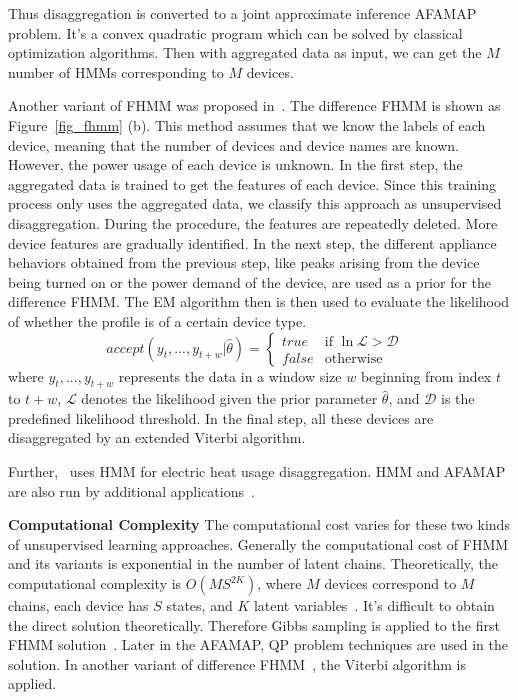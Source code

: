 Thus disaggregation is converted to a joint approximate inference AFAMAP problem.  
It's a convex quadratic program which can be solved by classical optimization algorithms.
Then with aggregated data as input, we can get the $M$ number of HMMs corresponding to $M$ devices. 

Another variant of FHMM was proposed in~\cite{parson2012nonintrusive}. 
The difference FHMM is shown as Figure~\ref{fig_fhmm} (b). 
This method assumes that we know the labels of each device, meaning that the number of devices and device names are known. 
However, the power usage of each device is unknown. 
In the first step, the aggregated data is 
trained to get the features of each device. 
Since this training process only uses the aggregated data, we classify this approach as unsupervised disaggregation. 
During the procedure, 
the features are repeatedly deleted. 
More device features are gradually identified. 
In the next step, the different appliance behaviors obtained from the previous step, like peaks arising from the device being turned on or the power demand of the device, 
are used as a prior for the difference FHMM. The EM algorithm then is then used to evaluate the likelihood of whether the profile is of a certain device type.
\begin{displaymath}
accept(y_{t},...,y_{t+w}|\hat{\theta})= \left \{ \begin{array} {ll}
true & \textrm{if $\ln\mathcal{L} > \mathcal{D}$ } \\
false & \textrm{otherwise} \end{array} \right.
\end{displaymath}
where $y_t,...,y_{t+w}$ represents the data in a window size $w$
beginning from index $t$ to $t+w$, $\mathcal{L}$ denotes the
likelihood given the prior parameter $\hat{\theta}$,
and $\mathcal{D}$ is the predefined likelihood threshold.
In the final step, all these devices are disaggregated by an extended Viterbi algorithm. 

Further,~\cite{huang2013designing} uses HMM for electric heat usage disaggregation. %
HMM and AFAMAP are also run by additional applications~\cite{lukaszewski2013methods}. 

\textbf{Computational Complexity}
The computational cost varies for these two kinds of unsupervised learning 
approaches.
Generally the computational cost of FHMM and its variants is exponential in 
the number of latent chains.  
Theoretically, the computational complexity is 
$O(MS^{2K})$, where $M$ devices correspond to $M$ chains, 
each device has $S$ states, and $K$ latent variables~\cite{bishop2006pattern}. 
It's difficult to obtain the direct solution theoretically. 
Therefore Gibbs sampling is applied to the first 
FHMM solution~\cite{kim2011unsupervised}. 
Later in the AFAMAP, QP problem techniques are used in the solution.
In another variant of difference FHMM~\cite{parson2012nonintrusive}, 
the Viterbi algorithm is applied. 

